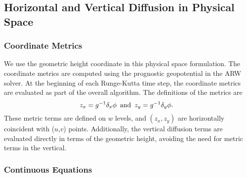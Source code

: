 \subsection{Horizontal and Vertical Diffusion in Physical Space}

\subsubsection{Coordinate Metrics}

We use the geometric height coordinate in this physical space
formulation.
The coordinate metrics are computed using the prognostic geopotential 
in the ARW solver.  At the beginning of each Runge-Kutta time step,
the coordinate metrics are evaluated as part of the overall 
algorithm.  The definitions of the metrics are
%
\begin{equation}
z_x = g^{-1} \delta_x \phi \,\,\, \hbox{and} \,\,\, 
z_y = g^{-1} \delta_y \phi.
\notag
\end{equation}
%
\noindent
These metric terms are defined on $w$ levels, and
 $(z_x, z_y)$ are 
horizontally  coincident with ($u$,$v$) points.
Additionally, the vertical  diffusion terms are evaluated
directly in terms of the geometric height, avoiding the need
for metric terms in the vertical.

\subsubsection{Continuous Equations}


